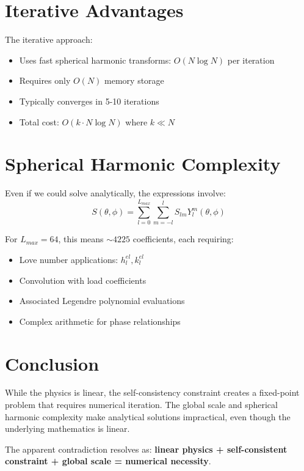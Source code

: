 \documentclass{article}
\begin{document}
\section{Iterative Advantages}

The iterative approach:
\begin{itemize}
\item Uses fast spherical harmonic transforms: $O(N \log N)$ per iteration
\item Requires only $O(N)$ memory storage
\item Typically converges in 5-10 iterations
\item Total cost: $O(k \cdot N \log N)$ where $k \ll N$
\end{itemize}

\section{Spherical Harmonic Complexity}

Even if we could solve analytically, the expressions involve:
\begin{equation}
S(\theta, \phi) = \sum_{l=0}^{L_{max}} \sum_{m=-l}^{l} S_{lm} Y_l^m(\theta, \phi)
\end{equation}

For $L_{max} = 64$, this means $\sim 4225$ coefficients, each requiring:
\begin{itemize}
\item Love number applications: $h_l^{el}, k_l^{el}$
\item Convolution with load coefficients
\item Associated Legendre polynomial evaluations
\item Complex arithmetic for phase relationships
\end{itemize}

\section{Conclusion}

While the physics is linear, the self-consistency constraint creates a fixed-point problem that requires numerical iteration. The global scale and spherical harmonic complexity make analytical solutions impractical, even though the underlying mathematics is linear.

The apparent contradiction resolves as: \textbf{linear physics + self-consistent constraint + global scale = numerical necessity}.
\end{document}
